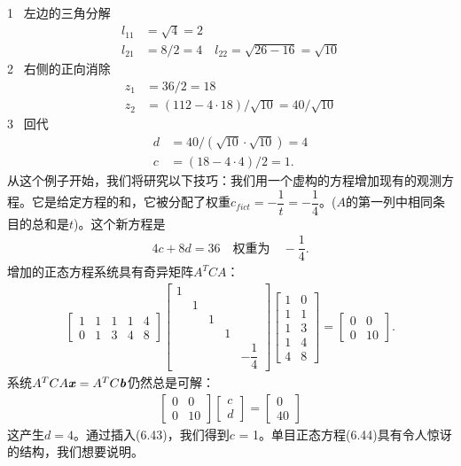 1 \ 左边的三角分解
\begin{align*}
l_{11} &= \sqrt{4} = 2 \\
l_{21} &=  8/2     = 4   \quad    l_{22} = \sqrt{26 - 16}  = \sqrt{10}
\end{align*}
2 \ 右侧的正向消除
\begin{align*}
z_{1} &= 36/2 = 18 \\
z_{2} &=  (112 - 4\cdot18) /\sqrt{10}  = 40 /\sqrt{10}
\end{align*}
3 \ 回代
\begin{align*}
d &= 40/(\sqrt{10}\cdot\sqrt{10}) = 4 \\
c &=  (18 - 4\cdot 4) / 2  = 1.
\end{align*}
从这个例子开始，我们将研究以下技巧：我们用一个虚构的方程增加现有的观测方程。它是给定方程的和，它被分配了权重$ c_{fict} = -\dfrac{1}{t} = - \dfrac{1}{4}$。($A$的第一列中相同条目的总和是$t$)。这个新方程是
\begin{align}
4c+8d = 36 \quad \text{权重为} \quad -\dfrac{1}{4}.
\end{align}
增加的正态方程系统具有奇异矩阵$A^{T}CA$：
\begin{align*}
\begin{bmatrix}
1 & 1 & 1 & 1 & 4 \\
0 & 1 & 3 & 4 & 8 
\end{bmatrix}
\begin{bmatrix}
1 &  &  &  &  \\
& 1  &  &  &  \\
& &  1  &  &  \\
& &  &  1  &  \\
& &  &  &  -\dfrac{1}{4}  
\end{bmatrix}
\begin{bmatrix}
1 & 0\\
1 & 1\\
1 & 3\\
1 & 4\\
4 & 8
\end{bmatrix} = 
\begin{bmatrix}
0 & 0\\
0 & 10
\end{bmatrix}.
\end{align*}
系统$ A^{T}CA\textbf{\textit{x}} = A^{T}C\textbf{\textit{b}}$仍然总是可解：
\begin{align}
\begin{bmatrix}
0 & 0\\
0 & 10
\end{bmatrix}
\begin{bmatrix}
c\\
d
\end{bmatrix} = 
\begin{bmatrix}
0\\
40
\end{bmatrix}
\end{align}
这产生$d = 4$。通过插入(6.43)，我们得到$c$ = 1。单目正态方程(6.44)具有令人惊讶的结构，我们想要说明。

